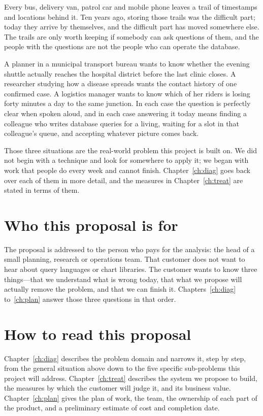 \documentclass[12pt,a4paper]{report}
\begin{document}
Every bus, delivery van, patrol car and mobile phone leaves a trail of
timestamps and locations behind it. Ten years ago, storing those trails was the
difficult part; today they arrive by themselves, and the difficult part has
moved somewhere else. The trails are only worth keeping if somebody can ask
questions of them, and the people with the questions are not the people who can
operate the database.

A planner in a municipal transport bureau wants to know whether the evening
shuttle actually reaches the hospital district before the last clinic closes. A
researcher studying how a disease spreads wants the contact history of one
confirmed case. A logistics manager wants to know which of her riders is losing
forty minutes a day to the same junction. In each case the question is perfectly
clear when spoken aloud, and in each case answering it today means finding a
colleague who writes database queries for a living, waiting for a slot in that
colleague's queue, and accepting whatever picture comes back.

Those three situations are the real-world problem this project is built on. We
did not begin with a technique and look for somewhere to apply it; we began with
work that people do every week and cannot finish. Chapter~\ref{ch:diag} goes
back over each of them in more detail, and the measures in
Chapter~\ref{ch:treat} are stated in terms of them.

\section{Who this proposal is for}

The proposal is addressed to the person who pays for the analysis: the head of a
small planning, research or operations team. That customer does not want to hear
about query languages or chart libraries. The customer wants to know three
things---that we understand what is wrong today, that what we propose will
actually remove the problem, and that we can finish it. Chapters~\ref{ch:diag}
to~\ref{ch:plan} answer those three questions in that order.

\section{How to read this proposal}

Chapter~\ref{ch:diag} describes the problem domain and narrows it, step by step,
from the general situation above down to the five specific sub-problems this
project will address. Chapter~\ref{ch:treat} describes the system we propose to
build, the measures by which the customer will judge it, and its business value.
Chapter~\ref{ch:plan} gives the plan of work, the team, the ownership of each
part of the product, and a preliminary estimate of cost and completion date.
\end{document}
